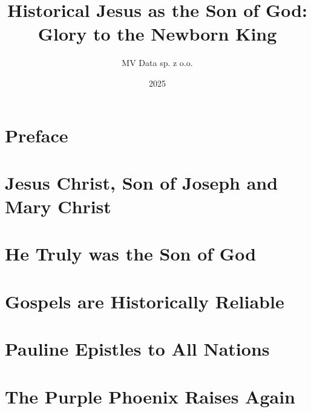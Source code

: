\documentclass[12pt]{book}
\title{Historical Jesus as the Son of God: Glory to the Newborn King}
\author{MV Data sp. z o.o.}
\date{2025}
\begin{document}
\maketitle

\tableofcontents

\chapter*{Preface}


\chapter{Jesus Christ, Son of Joseph and Mary Christ}\label{ch:jesus-christ-son-of-joseph-and-mary-christ}


\chapter{He Truly was the Son of God}\label{ch:he-truly-was-the-son-of-god}


\chapter{Gospels are Historically Reliable}\label{ch:gospels-are-historically-reliable}


\chapter{Pauline Epistles to All Nations}\label{ch:pauline-epistles-to-all-nations}


\chapter{The Purple Phoenix Raises Again}\label{ch:the-purple-phoenix-raises-again}

\end{document}
